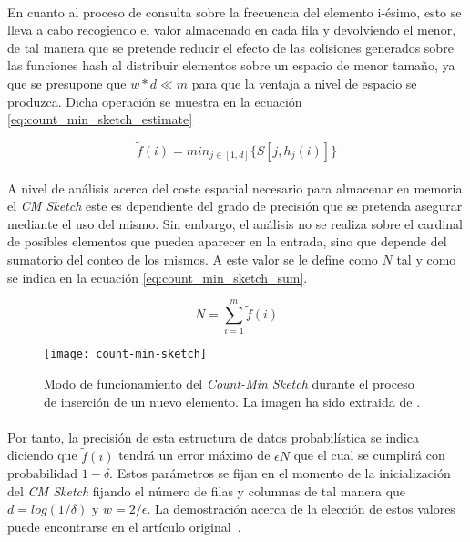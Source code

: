 \documentclass{subfiles}
\begin{document}
      \paragraph{}
      En cuanto al proceso de consulta sobre la frecuencia del elemento i-ésimo, esto se lleva a cabo recogiendo el valor almacenado en cada fila y devolviendo el menor, de tal manera que se pretende reducir el efecto de las colisiones generados sobre las funciones hash al distribuir elementos sobre un espacio de menor tamaño, ya que se presupone que $w * d \ll m$ para que la ventaja a nivel de espacio se produzca. Dicha operación se muestra en la ecuación \eqref{eq:count_min_sketch_estimate}

      \begin{equation}
      \label{eq:count_min_sketch_estimate}
        \widetilde{f}(i) = min_{j \in [1,d]}\{S[j, h_j(i)]\}
      \end{equation}

      \paragraph{}
      A nivel de análisis acerca del coste espacial necesario para almacenar en memoria el \emph{CM Sketch} este es dependiente del grado de precisión que se pretenda asegurar mediante el uso del mismo. Sin embargo, el análisis no se realiza sobre el cardinal de posibles elementos que pueden aparecer en la entrada, sino que depende del sumatorio del conteo de los mismos. A este valor se le define como $N$ tal y como se indica en la ecuación \eqref{eq:count_min_sketch_sum}.

      \begin{equation}
      \label{eq:count_min_sketch_sum}
        N = \sum_{i=1}^m \widetilde{f}(i)
      \end{equation}

      \begin{figure}
        \centering
        \texttt{[image: count-min-sketch]}
        \caption{Modo de funcionamiento del \emph{Count-Min Sketch} durante el proceso de inserción de un nuevo elemento. La imagen ha sido extraida de \cite{cormode2005improved}.}
        \label{fig:count_min_sketch}
      \end{figure}

      \paragraph{}
      Por tanto, la precisión de esta estructura de datos probabilística se indica diciendo que $\widetilde{f}(i)$ tendrá un error máximo de $\epsilon N$ que el cual se cumplirá con probabilidad $1-\delta$. Estos parámetros se fijan en el momento de la inicialización del \emph{CM Sketch} fijando el número de filas y columnas de tal manera que $d = log(1/\delta)$ y $w=2/\epsilon$. La demostración acerca de la elección de estos valores puede encontrarse en el artículo original \cite{cormode2005improved}.
\end{document}
